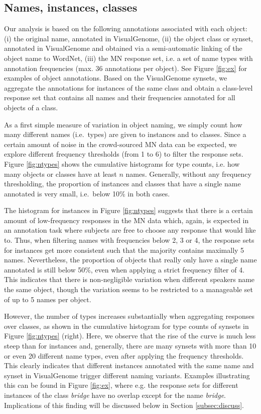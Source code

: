 \subsection{Names, instances, classes}
\label{subsec:counts}

Our analysis is based on the following annotations associated with each object: (i) the original name, annotated in VisualGenome, (ii) the object class or synset, annotated in VisualGenome and obtained via a semi-automatic linking of the object name to WordNet, (iii) the MN response set, i.e. a set of name types with annotation frequencies (max. 36 annotations per object). See Figure \ref{fig:ex} for examples of object annotations. Based on the VisualGenome synsets, we aggregate the annotations for instances of the same class and obtain a class-level response set that contains all names and their frequencies annotated for all objects of a class. 
 
As a first simple measure of variation in object naming, we simply count how many different names (i.e.\ types) are given to instances and to classes.
Since a certain amount of noise in the crowd-sourced MN data can be expected, we explore different frequency thresholds (from 1 to 6) to filter the response sets.
Figure \ref{fig:ntypes} shows the cumulative histograms for type counts, i.e. how many objects or classes have at least $n$ names.
Generally, without any frequency thresholding, the proportion of instances and classes that have a single name annotated is very small, i.e.\ below 10\% in both cases. 

The histogram for instances in Figure \ref{fig:ntypes} suggests that there is a certain amount of low-frequency responses in the MN data which, again, is expected in an annotation task where subjects are free to choose any response that would like to. Thus, when filtering names with frequencies below 2, 3 or 4, the response sets for instances get more consistent such that the majority contains maximally 5 names.
Nevertheless, the proportion of objects that really only have a single name annotated is still below 50\%, even when applying a strict frequency filter of 4.
This indicates that there is non-negligible variation when different speakers name the same object, though the variation seems to be restricted to a manageable set of up to 5 names per object.

However, the number of types increases substantially when aggregating responses over classes, as shown in the cumulative histogram for type counts of synsets in Figure \ref{fig:ntypes} (right).
Here, we observe that the rise of the curve is much less steep than for instances and, generally, there are many synsets with more than 10 or even 20 different name types, even after applying the frequency thresholds. This clearly indicates that different instances annotated with the same name and synset in VisualGenome trigger different naming variants. Examples illustrating this can be found in Figure \ref{fig:ex}, where e.g. the response sets for different instances of the class \textit{bridge} have no overlap except for the name \textit{bridge}. Implications of this finding will be discussed below in Section \ref{subsec:discuss}.

